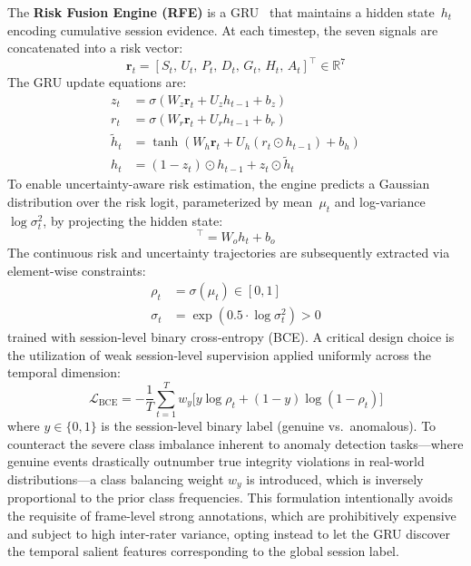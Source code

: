 \documentclass[journal]{IEEEtran}
\begin{document}
The \textbf{Risk Fusion Engine (RFE)} is a GRU~\cite{Cho2014} that maintains a hidden state~$h_t$ encoding cumulative session evidence. At each timestep, the seven signals are concatenated into a risk vector:
\begin{equation}
    \mathbf{r}_t = [S_t,\, U_t,\, P_t,\, D_t,\, G_t,\, H_t,\, A_t]^\top \in \mathbb{R}^7
    \label{eq:riskvec}
\end{equation}
The GRU update equations are:
\begin{align}
    z_t &= \sigma(W_z \mathbf{r}_t + U_z h_{t-1} + b_z) \label{eq:gru_z} \\
    r_t &= \sigma(W_r \mathbf{r}_t + U_r h_{t-1} + b_r) \label{eq:gru_r} \\
    \tilde{h}_t &= \tanh(W_h \mathbf{r}_t + U_h (r_t \odot h_{t-1}) + b_h) \label{eq:gru_h} \\
    h_t &= (1 - z_t) \odot h_{t-1} + z_t \odot \tilde{h}_t \label{eq:gru_update}
\end{align}
To enable uncertainty-aware risk estimation, the engine predicts a Gaussian distribution over the risk logit, parameterized by mean~$\mu_t$ and log-variance~$\log \sigma_t^2$, by projecting the hidden state:
\begin{equation}
    [\mu_t, \log \sigma_t^2]^\top = W_o h_t + b_o 
    \label{eq:uncertainty_proj}
\end{equation}
The continuous risk and uncertainty trajectories are subsequently extracted via element-wise constraints:
\begin{align}
    \rho_t &= \sigma(\mu_t) \in [0, 1] \label{eq:rho} \\
    \sigma_t &= \exp(0.5 \cdot \log \sigma_t^2) > 0 \label{eq:sigma}
\end{align}
trained with session-level binary cross-entropy (BCE). A critical design choice is the utilization of weak session-level supervision applied uniformly across the temporal dimension:
\begin{equation}
    \mathcal{L}_{\mathrm{BCE}} = -\frac{1}{T} \sum_{t=1}^{T} w_y \bigl[ y \log \rho_t + (1{-}y) \log(1{-}\rho_t) \bigr]
    \label{eq:loss}
\end{equation}
where $y \in \{0,1\}$ is the session-level binary label (genuine vs.\ anomalous). To counteract the severe class imbalance inherent to anomaly detection tasks---where genuine events drastically outnumber true integrity violations in real-world distributions---a class balancing weight $w_y$ is introduced, which is inversely proportional to the prior class frequencies. This formulation intentionally avoids the requisite of frame-level strong annotations, which are prohibitively expensive and subject to high inter-rater variance, opting instead to let the GRU discover the temporal salient features corresponding to the global session label.
\end{document}
